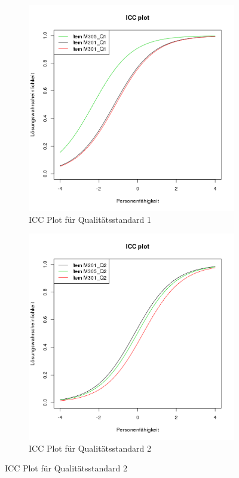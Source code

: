   
 \begin{figure}[htp]
 \centering
 \begin{subfigure}{0.49\textwidth}
   \includegraphics[width=1.0\linewidth]{graphics/ICCQ1.png}
   \caption{ICC Plot für Qualitätsstandard 1}
   \label{fig:ICCQ1}
 \end{subfigure}
 \begin{subfigure}{0.49\textwidth}
   \includegraphics[width=1.0\linewidth]{graphics/ICCQ2.png}
   \caption{ICC Plot für Qualitätsstandard 2}
   \label{fig:ICCQ2}
 \end{subfigure}
 \end{figure}
